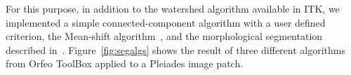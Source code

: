 \documentclass{josis}
\begin{document}
For this purpose, in addition to the watershed algorithm available in ITK, we
implemented a simple connected-component algorithm with a user defined
criterion, the Mean-shift algorithm~\cite{comaniciu2002mean}, and the
morphological segmentation described
in~\cite{pesaresi2001new}. Figure~\ref{fig:segalgs} shows the result of three
different algorithms from Orfeo ToolBox applied to a Pleiades image patch.

\begin{figure}[!htb]
\centering
{}
\quad
{}
\quad
{}\\


\end{figure}
\end{document}
